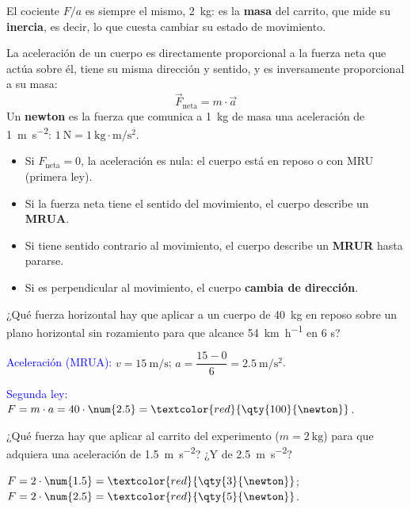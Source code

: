 El cociente \(F/a\) es siempre el mismo, \qty{2}{\kg}: es la \textbf{masa} del carrito, que mide su \textbf{inercia}, es decir, lo que cuesta cambiar su estado de movimiento.

\begin{definition}
    La aceleración de un cuerpo es directamente proporcional a la fuerza neta que actúa sobre él, tiene su misma dirección y sentido, y es inversamente proporcional a su masa:
    \[ \vec{F}_\text{neta} = m \cdot \vec{a} \]
    Un \textbf{newton} es la fuerza que comunica a \qty{1}{\kg} de masa una aceleración de \qty{1}{\m\per\square\s}: \(\qty{1}{\newton} = \qty{1}{\kg\cdot\m\per\square\s}\).
\end{definition}

\begin{itemize}
    \item Si \(F_\text{neta} = 0\), la aceleración es nula: el cuerpo está en reposo o con MRU (primera ley).
    \item Si la fuerza neta tiene el sentido del movimiento, el cuerpo describe un \textbf{MRUA}.
    \item Si tiene sentido contrario al movimiento, el cuerpo describe un \textbf{MRUR} hasta pararse.
    \item Si es perpendicular al movimiento, el cuerpo \textbf{cambia de dirección}.
\end{itemize}

\begin{example}
    ¿Qué fuerza horizontal hay que aplicar a un cuerpo de \qty{40}{\kg} en reposo sobre un plano horizontal sin rozamiento para que alcance \qty{54}{\km\per\hour} en 6 s?

    \textcolor{blue}{Aceleración (MRUA):} \(v = \qty{15}{\m\per\s}\); \(a = \dfrac{15 - 0}{6} = \qty{2.5}{\m\per\square\s}\).

    \textcolor{blue}{Segunda ley:} \(F = m \cdot a = 40 \cdot \num{2.5} = \textcolor{red}{\qty{100}{\newton}}\).
\end{example}

\begin{exercise}
    ¿Qué fuerza hay que aplicar al carrito del experimento (\(m = \qty{2}{\kg}\)) para que adquiera una aceleración de \qty{1.5}{\m\per\square\s}? ¿Y de \qty{2.5}{\m\per\square\s}?
    \begin{solu}
        \(F = 2 \cdot \num{1.5} = \textcolor{red}{\qty{3}{\newton}}\); \(F = 2 \cdot \num{2.5} = \textcolor{red}{\qty{5}{\newton}}\).
    \end{solu}
\end{exercise}

